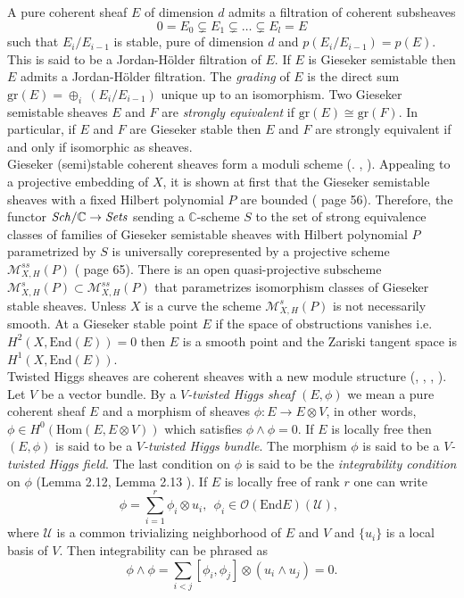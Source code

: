 \documentclass[12pt]{amsart}
\theoremstyle{definition}
\theoremstyle{remark}
\numberwithin{equation}{section}
\begin{document}
A pure coherent sheaf $E$ of dimension $d$ admits a filtration of coherent subsheaves 
\begin{equation}
0 = E_0\subsetneq E_1\subsetneq\dots\subsetneq E_l = E 
\end{equation}
such that $E_i/E_{i-1}$ is stable, pure of dimension $d$ and $p(E_i/E_{i-1}) = p(E)$. This is said to be a Jordan-H\"older filtration of $E$. If $E$ is Gieseker semistable then $E$ admits a Jordan-H\"older filtration. The \textit{grading} of $E$ is the direct sum $\mbox{gr}(E) = \oplus_i ~(E_i/E_{i-1})$ unique up to an isomorphism. Two Gieseker semistable sheaves $E$ and $F$ are \textit{strongly equivalent} if $\mbox{gr}(E)\cong\mbox{gr}(F)$.
In particular, if $E$ and $F$ are Gieseker stable then $E$ and $F$ are strongly equivalent if and only if isomorphic as sheaves.\\

Gieseker (semi)stable coherent sheaves form a moduli scheme (. \cite{Simp1}, \cite{Simp2}). Appealing to a projective embedding of $X$, it is shown at first that the Gieseker semistable sheaves with a fixed Hilbert polynomial $P$ are bounded (\cite{Simp1} page 56). Therefore, the functor $\mbox{\textit{Sch}}/\mathbb{C}\to \mbox{\textit{Sets}}$ sending a $\mathbb{C}$-scheme $S$ to the set of strong equivalence classes of families of Gieseker semistable sheaves with Hilbert polynomial $P$ parametrized by $S$ is universally corepresented by a projective scheme $\mathcal{M}_{X, H}^{ss}(P)$ (\cite{Simp1} page 65). There is an open quasi-projective subscheme $\mathcal{M}_{X, H}^{s}(P)\subset\mathcal{M}_{X, H}^{ss}(P)$ that parametrizes isomorphism classes of Gieseker stable sheaves. Unless $X$ is a curve the scheme $\mathcal{M}_{X, H}^{s}(P)$ is not necessarily smooth. At a Gieseker stable point $E$ if the space of obstructions vanishes i.e.  $H^2(X, \mbox{End}(E)) = 0$ then $E$ is a smooth point and the Zariski tangent space is $H^1(X, \mbox{End}(E))$.\\

Twisted Higgs sheaves are coherent sheaves with a new module structure (\cite{Nitin}, \cite{Simp1}, \cite{Simp2}, \cite{Gallego}). Let $V$ be a vector bundle. By a \textit{$V$-twisted Higgs sheaf $(E, \phi)$} we mean a pure coherent sheaf $E$ and a morphism of sheaves $\phi:E\to E\otimes V$, in other words, $\phi\in H^0(\mbox{Hom}(E, E\otimes V))$ which satisfies $\phi\wedge\phi = 0$. If $E$ is locally free then $(E, \phi)$ is said to be a \textit{$V$-twisted Higgs bundle}. The morphism $\phi$ is said to be a \textit{$V$-twisted Higgs field}. The last condition on $\phi$ is said to be the \textit{integrability condition} on $\phi$ (Lemma 2.12, Lemma 2.13 \cite{Simp1}). If $E$ is locally free of rank $r$ one can write 
\begin{equation}
\phi = \sum\limits_{i=1}^r\phi_i\otimes u_i,~~ \phi_i\in\mathcal{O}(\mbox{End}E)(\mathcal{U}),~~
\end{equation}
where $\mathcal{U}$ is a common trivializing neighborhood of $E$ and $V$ and $\{u_i\}$ is a local basis of $V$. Then integrability can be phrased as 
\begin{equation}\label{inte}
\phi\wedge\phi = \sum\limits_{i<j} [\phi_i, \phi_j]\otimes (u_i\wedge u_j) = 0.
\end{equation}
\end{document}
